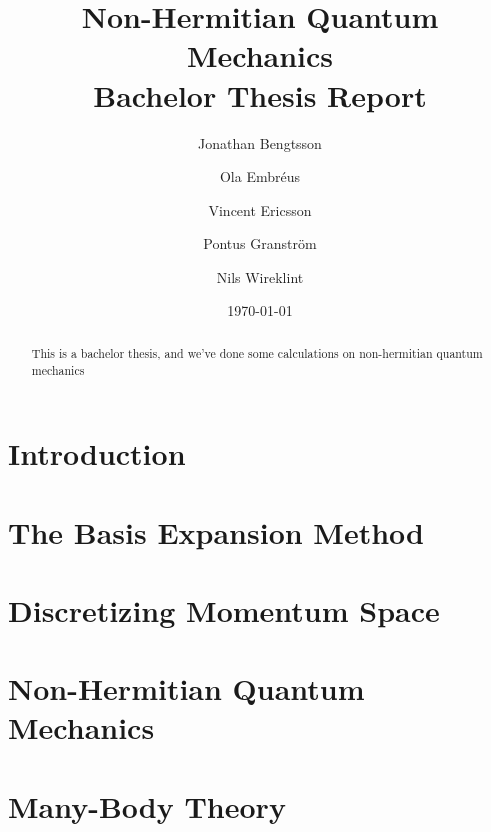 \documentclass[12pt,a4paper]{report}
\begin{document}
  


\title{Non-Hermitian Quantum Mechanics\\
\Large Bachelor Thesis Report}
\author{Jonathan Bengtsson  \and Ola Embréus \and Vincent Ericsson \and Pontus Granström \and Nils Wireklint}
\date{\today}



\maketitle

\newpage
\begin{abstract}
This is a bachelor thesis, and we've done some calculations on non-hermitian quantum mechanics 
\end{abstract}
\newpage

\tableofcontents

\newpage

\chapter{Introduction}
\label{cha:introduktion}



\chapter{The Basis Expansion Method}
\label{cha:the_basis_expansion_method}



\chapter{Discretizing Momentum Space}
\label{cha:discretizing_momentum_space}

%

\chapter{Non-Hermitian Quantum Mechanics} 
\label{cha:non_hermitian_quantum_mechanics}


\chapter{Many-Body Theory}
\label{cha:many_body_theory}



\end{document}
